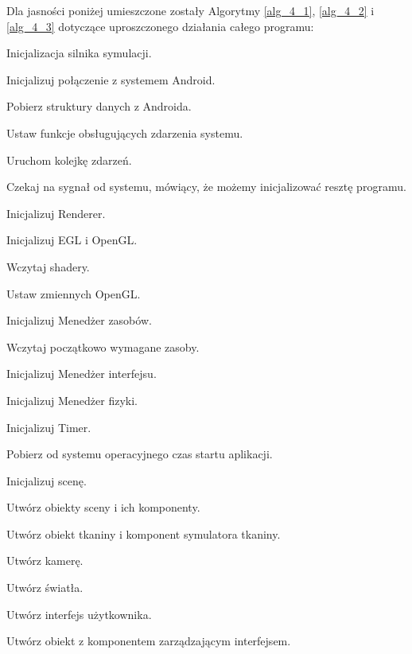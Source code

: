 	Dla jasności poniżej umieszczone zostały Algorytmy \ref{alg_4_1}, \ref{alg_4_2} i \ref{alg_4_3} dotyczące uproszczonego działania całego programu:
	
	\begin{algorithm}
		\label{alg_4_1}
		\caption{Inicjalizacja silnika symulacji.}
			
				Inicjalizuj połączenie z systemem Android.
				
				\Indp
				
					Pobierz struktury danych z Androida.
					
					Ustaw funkcje obsługujących zdarzenia systemu.
					
					Uruchom kolejkę zdarzeń.
					
					Czekaj na sygnał od systemu, mówiący, że możemy inicjalizować resztę programu.
				
				\Indm
									
				Inicjalizuj Renderer.
				
				\Indp
				
					Inicjalizuj EGL i OpenGL.
					
					Wczytaj shadery.
					
					Ustaw zmiennych OpenGL.
					
				\Indm	
				
				Inicjalizuj Menedżer zasobów.
				
				\Indp
					
					Wczytaj początkowo wymagane zasoby.
				
				\Indm	
				
				Inicjalizuj Menedżer interfejsu.
				
				Inicjalizuj Menedżer fizyki.
				
				Inicjalizuj Timer.
				
				\Indp
				
					Pobierz od systemu operacyjnego czas startu aplikacji.
				
				\Indm
				
				Inicjalizuj scenę.
				
				\Indp
				
					Utwórz obiekty sceny i ich komponenty.
					
					Utwórz obiekt tkaniny i komponent symulatora tkaniny.
					
					Utwórz kamerę.
					
					Utwórz światła.
					
					Utwórz interfejs użytkownika.
					
					Utwórz obiekt z komponentem zarządzającym interfejsem.
				
				\Indm			
	\end{algorithm}
	
